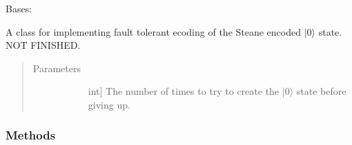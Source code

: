 \documentclass[letterpaper,10pt,english]{sphinxmanual}
\begin{document}
\begin{fulllineitems}
\begin{fulllineitems}
\begin{quote}
\begin{description}
\begin{description}
\end{description}

\end{description}\end{quote}

\end{fulllineitems}


\end{fulllineitems}


\begin{fulllineitems}
\label{\detokenize{Steane:Steane.SteaneFaultTolerantEncoder}}
Bases: {\hyperref[\detokenize{Base:BaseFaultTolerance.FaultTolerantEncoder}]{}}

A class for implementing fault tolerant ecoding of the Steane encoded \(|0\rangle\) state.
NOT FINISHED.
\begin{quote}\begin{description}
\item[{Parameters}] \leavevmode\begin{description}
\item[{}] \leavevmode{[}int{]}
The number of times to try to create the \(|0\rangle\) state before giving up.

\end{description}

\end{description}\end{quote}
\subsubsection*{Methods}


\begin{savenotes}\sphinxattablestart
\centering
\begin{tabulary}{\linewidth}[t]{|T|T|}
\hline


\end{tabulary}
\end{savenotes}
\end{fulllineitems}
\end{document}
